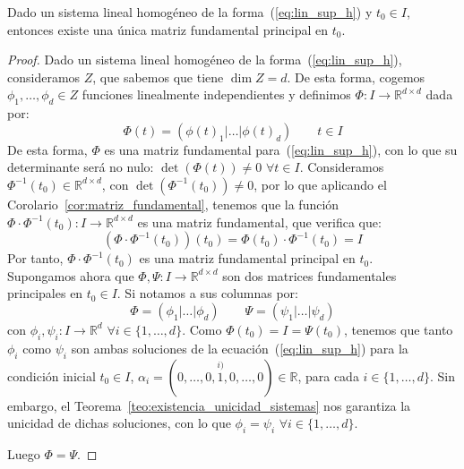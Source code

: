 \begin{prop}
    Dado un sistema lineal homogéneo de la forma~(\ref{eq:lin_sup_h}) y $t_0\in I$, entonces existe una única matriz fundamental principal en $t_0$.
    \begin{proof}
        Dado un sistema lineal homogéneo de la forma~(\ref{eq:lin_sup_h}), consideramos $Z$, que sabemos que tiene $\dim Z = d$. De esta forma, cogemos $\phi_1,\ldots,\phi_d \in Z$ funciones linealmente independientes y definimos $\Phi:I\rightarrow\mathbb{R}^{d\times d}$ dada por:
        \begin{equation*}
            \Phi(t) = (\phi(t)_1|\ldots|\phi(t)_d)  \qquad t\in I
        \end{equation*}
        De esta forma, $\Phi$ es una matriz fundamental para~(\ref{eq:lin_sup_h}), con lo que su determinante será no nulo: $\det(\Phi(t)) \neq 0$ $\forall t\in I$. Consideramos $\Phi^{-1}(t_0) \in \mathbb{R}^{d\times d}$, con $\det(\Phi^{-1}(t_0)) \neq 0$, por lo que aplicando el Corolario~\ref{cor:matriz_fundamental}, tenemos que la función $\Phi\cdot \Phi^{-1}(t_0):I\rightarrow\mathbb{R}^{d\times d}$ es una matriz fundamental, que verifica que:
        \begin{equation*}
            (\Phi\cdot \Phi^{-1}(t_0))(t_0) = \Phi(t_0)\cdot \Phi^{-1}(t_0) = I
        \end{equation*}
        Por tanto, $\Phi\cdot \Phi^{-1}(t_0)$ es una matriz fundamental principal en $t_0$.\\

        Supongamos ahora que $\Phi,\Psi:I\rightarrow\mathbb{R}^{d\times d}$ son dos matrices fundamentales principales en $t_0\in I$. Si notamos a sus columnas por:
        \begin{equation*}
            \Phi = (\phi_1|\ldots|\phi_d) \qquad \Psi = (\psi_1|\ldots|\psi_d)
        \end{equation*}
        con $\phi_i,\psi_i:I\rightarrow\mathbb{R}^d$ $\forall i \in \{1,\ldots,d\}$. Como $\Phi(t_0) = I = \Psi(t_0)$, tenemos que tanto $\phi_i$ como $\psi_i$ son ambas soluciones de la ecuación~(\ref{eq:lin_sup_h}) para la condición inicial $t_0\in I$, $\alpha_i =(0,\ldots,0,\stackrel{i)}{1},0,\ldots,0)\in \mathbb{R}$, para cada $i \in \{1,\ldots,d\}$. Sin embargo, el Teorema~\ref{teo:existencia_unicidad_sistemas} nos garantiza la unicidad de dichas soluciones, con lo que $\phi_i = \psi_i$ $\forall i \in \{1,\ldots,d\}$.

        Luego $\Phi = \Psi$.
    \end{proof}
\end{prop}

